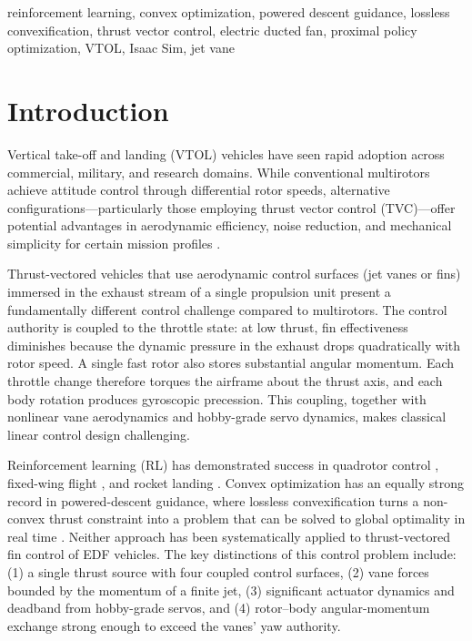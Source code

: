 \documentclass[conference]{IEEEtran}
\begin{document}
\begin{IEEEkeywords}
reinforcement learning, convex optimization, powered descent guidance, lossless convexification, thrust vector control, electric ducted fan, proximal policy optimization, VTOL, Isaac Sim, jet vane
\end{IEEEkeywords}

\section{Introduction}

Vertical take-off and landing (VTOL) vehicles have seen rapid adoption across commercial, military, and research domains. While conventional multirotors achieve attitude control through differential rotor speeds, alternative configurations---particularly those employing thrust vector control (TVC)---offer potential advantages in aerodynamic efficiency, noise reduction, and mechanical simplicity for certain mission profiles \cite{b1}.

Thrust-vectored vehicles that use aerodynamic control surfaces (jet vanes or fins) immersed in the exhaust stream of a single propulsion unit present a fundamentally different control challenge compared to multirotors. The control authority is coupled to the throttle state: at low thrust, fin effectiveness diminishes because the dynamic pressure in the exhaust drops quadratically with rotor speed. A single fast rotor also stores substantial angular momentum. Each throttle change therefore torques the airframe about the thrust axis, and each body rotation produces gyroscopic precession. This coupling, together with nonlinear vane aerodynamics and hobby-grade servo dynamics, makes classical linear control design challenging.

Reinforcement learning (RL) has demonstrated success in quadrotor control \cite{b2, b3}, fixed-wing flight \cite{b4}, and rocket landing \cite{b5}. Convex optimization has an equally strong record in powered-descent guidance, where lossless convexification turns a non-convex thrust constraint into a problem that can be solved to global optimality in real time \cite{b21, b22}. Neither approach has been systematically applied to thrust-vectored fin control of EDF vehicles. The key distinctions of this control problem include: (1) a single thrust source with four coupled control surfaces, (2) vane forces bounded by the momentum of a finite jet, (3) significant actuator dynamics and deadband from hobby-grade servos, and (4) rotor--body angular-momentum exchange strong enough to exceed the vanes' yaw authority.
\end{document}
